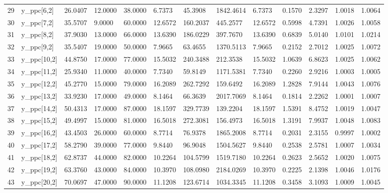\begin{table}[ht]
\begin{tabular}{rllllllllllll}
  29 & y\_ppc[6,2] &  26.0407 &  12.0000 &  38.0000 &  6.7373 &  45.3908 & 1842.4614 &  6.7373 & 0.1570 & 2.3297 & 1.0018 & 1.0064 \\ 
  30 & y\_ppc[7,2] &  35.5707 &   9.0000 &  60.0000 & 12.6572 & 160.2037 &  445.2577 & 12.6572 & 0.5998 & 4.7391 & 1.0026 & 1.0058 \\ 
  31 & y\_ppc[8,2] &  37.9030 &  13.0000 &  66.0000 & 13.6390 & 186.0229 &  397.7670 & 13.6390 & 0.6839 & 5.0140 & 1.0101 & 1.0214 \\ 
  32 & y\_ppc[9,2] &  35.5407 &  19.0000 &  50.0000 &  7.9665 &  63.4655 & 1370.5113 &  7.9665 & 0.2152 & 2.7012 & 1.0025 & 1.0072 \\ 
  33 & y\_ppc[10,2] &  44.8750 &  17.0000 &  77.0000 & 15.5032 & 240.3488 &  212.3538 & 15.5032 & 1.0639 & 6.8623 & 1.0025 & 1.0062 \\ 
  34 & y\_ppc[11,2] &  25.9340 &  11.0000 &  40.0000 &  7.7340 &  59.8149 & 1171.5381 &  7.7340 & 0.2260 & 2.9216 & 1.0003 & 1.0005 \\ 
  35 & y\_ppc[12,2] &  45.2770 &  15.0000 &  79.0000 & 16.2089 & 262.7292 &  159.6492 & 16.2089 & 1.2828 & 7.9144 & 1.0043 & 1.0076 \\ 
  36 & y\_ppc[13,2] &  33.9230 &  17.0000 &  49.0000 &  8.1464 &  66.3639 & 2017.7069 &  8.1464 & 0.1814 & 2.2262 & 1.0001 & 1.0007 \\ 
  37 & y\_ppc[14,2] &  50.4313 &  17.0000 &  87.0000 & 18.1597 & 329.7739 &  139.2204 & 18.1597 & 1.5391 & 8.4752 & 1.0019 & 1.0047 \\ 
  38 & y\_ppc[15,2] &  49.4997 &  15.0000 &  81.0000 & 16.5018 & 272.3081 &  156.4973 & 16.5018 & 1.3191 & 7.9937 & 1.0048 & 1.0083 \\ 
  39 & y\_ppc[16,2] &  43.4503 &  26.0000 &  60.0000 &  8.7714 &  76.9378 & 1865.2008 &  8.7714 & 0.2031 & 2.3155 & 0.9997 & 1.0002 \\ 
  40 & y\_ppc[17,2] &  58.2790 &  39.0000 &  77.0000 &  9.8440 &  96.9048 & 1504.5627 &  9.8440 & 0.2538 & 2.5781 & 1.0007 & 1.0034 \\ 
  41 & y\_ppc[18,2] &  62.8737 &  44.0000 &  82.0000 & 10.2264 & 104.5799 & 1519.7180 & 10.2264 & 0.2623 & 2.5652 & 1.0020 & 1.0075 \\ 
  42 & y\_ppc[19,2] &  63.3760 &  43.0000 &  84.0000 & 10.3970 & 108.0980 & 2184.0269 & 10.3970 & 0.2225 & 2.1398 & 1.0046 & 1.0176 \\ 
  43 & y\_ppc[20,2] &  70.0697 &  47.0000 &  90.0000 & 11.1208 & 123.6714 & 1034.3345 & 11.1208 & 0.3458 & 3.1093 & 1.0009 & 1.0045 \\ 

\end{tabular}
\end{table}
